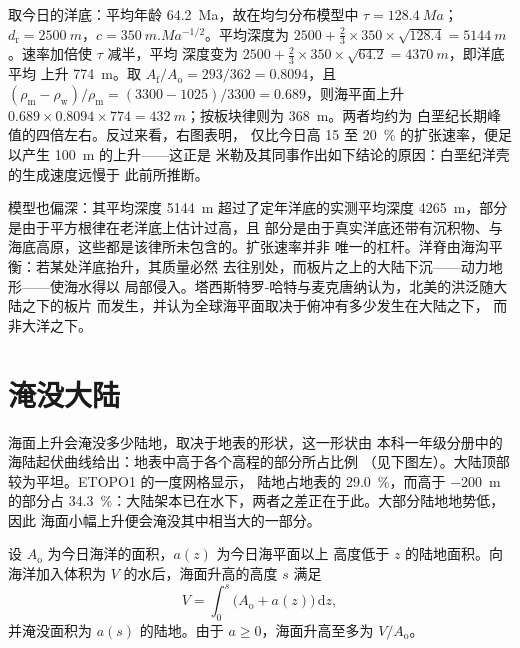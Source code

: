 \begin{example}[速率翻倍]\label{ex:b2:phanerozoic-earth:doubling}
取今日的洋底：平均年龄 \qty{64.2}{Ma}，故在均匀分布模型中 $\tau = \qty{128.4}{Ma}$；
$d_{\text{r}} = \qty{2500}{m}$，$c = \qty{350}{m.Ma^{-1/2}}$。平均深度为 $2500 + \tfrac23
\times 350 \times \sqrt{128.4} = \qty{5144}{m}$。速率加倍使 $\tau$ 减半，平均
深度变为 $2500 + \tfrac23 \times 350 \times \sqrt{64.2} = \qty{4370}{m}$，即洋底平均
上升 \qty{774}{m}。取 $A_{\text{f}}/A_{\text{o}} = 293/362 = 0.8094$，且
$(\rho_{\text{m}} - \rho_{\text{w}})/\rho_{\text{m}} = (3300 - 1025)/3300 = 0.689$，则海平面上升
$0.689 \times 0.8094 \times 774 = \qty{432}{m}$；按板块律则为 \qty{368}{m}。两者均约为
白垩纪长期峰值的四倍左右。反过来看，右图表明，
仅比今日高 15 至 \qty{20}{\percent} 的扩张速率，便足以产生 \qty{100}{m} 的上升——这正是
米勒及其同事作出如下结论的原因：白垩纪洋壳的生成速度远慢于
此前所推断。
\end{example}

模型也偏深：其平均深度 \qty{5144}{m} 超过了定年洋底的实测平均深度
\qty{4265}{m}，部分是由于平方根律在老洋底上估计过高，且
部分是由于真实洋底还带有沉积物、与海底高原，这些都是该律所未包含的。扩张速率并非
唯一的杠杆。洋脊由海沟平衡：若某处洋底抬升，其质量必然
去往别处，而板片之上的大陆下沉——动力地形——使海水得以
局部侵入。塔西斯特罗-哈特与麦克唐纳认为，北美的洪泛随大陆之下的板片
而发生，并认为全球海平面取决于俯冲有多少发生在大陆之下，
而非大洋之下。

\section{淹没大陆}\label{sec:b2:phanerozoic-earth:flooding}

海面上升会淹没多少陆地，取决于地表的形状，这一形状由
本科一年级分册中的海陆起伏曲线给出：地表中高于各个高程的部分所占比例
（见下图左）。大陆顶部较为平坦。ETOPO1 的一度网格显示，
陆地占地表的 \qty{29.0}{\percent}，而高于
\qty{-200}{m} 的部分占 \qty{34.3}{\percent}：大陆架本已在水下，两者之差正在于此。大部分陆地地势低，因此
海面小幅上升便会淹没其中相当大的一部分。

\begin{proposition}[陆地的淹没]\label{prop:b2:phanerozoic-earth:flooding}
设 $A_{\text{o}}$ 为今日海洋的面积，$a(z)$ 为今日海平面以上
高度低于 $z$ 的陆地面积。向海洋加入体积为 $V$ 的水后，海面升高的高度 $s$
满足
\[
V = \int_0^s \bigl(A_{\text{o}} + a(z)\bigr)\,\mathrm{d}z ,
\]
并淹没面积为 $a(s)$ 的陆地。由于 $a \ge 0$，海面升高至多为 $V/A_{\text{o}}$。
\end{proposition}

